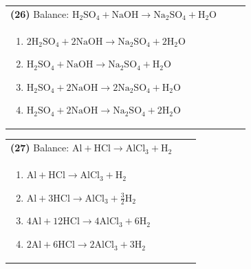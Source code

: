 \documentclass{article}
\begin{document}
{\vspace{0.2cm}
\noindent \begin{tabular}{|p{0.9\linewidth}|}
\hline
\vspace{0.2cm}
\textbf{(26)} Balance: \(\mathrm{H_2SO_4 + NaOH \rightarrow Na_2SO_4 + H_2O}\)\\
\begin{minipage}[t]{0.85\linewidth}
\begin{enumerate}[label=\alph*.]
   \item \(\mathrm{2H_2SO_4 + 2NaOH \rightarrow Na_2SO_4 + 2H_2O}\)
   \item \(\mathrm{H_2SO_4 + NaOH \rightarrow Na_2SO_4 + H_2O}\)
   \item \(\mathrm{H_2SO_4 + 2NaOH \rightarrow 2Na_2SO_4 + H_2O}\)
   \item \(\mathrm{H_2SO_4 + 2NaOH \rightarrow Na_2SO_4 + 2H_2O}\)
\end{enumerate}
\end{minipage}\\
\hline
\end{tabular}

\vspace{0.2cm}
\noindent \begin{tabular}{|p{0.9\linewidth}|}
\hline
\vspace{0.2cm}
\textbf{(27)} Balance: \(\mathrm{Al + HCl \rightarrow AlCl_3 + H_2}\)\\
\begin{minipage}[t]{0.85\linewidth}
\begin{enumerate}[label=\alph*.]
   \item \(\mathrm{Al + HCl \rightarrow AlCl_3 + H_2}\)
   \item \(\mathrm{Al + 3HCl \rightarrow AlCl_3 + \tfrac{3}{2}H_2}\)
   \item \(\mathrm{4Al + 12HCl \rightarrow 4AlCl_3 + 6H_2}\)
   \item \(\mathrm{2Al + 6HCl \rightarrow 2AlCl_3 + 3H_2}\)
\end{enumerate}
\end{minipage}\\
\hline
\end{tabular}

}
\end{document}
